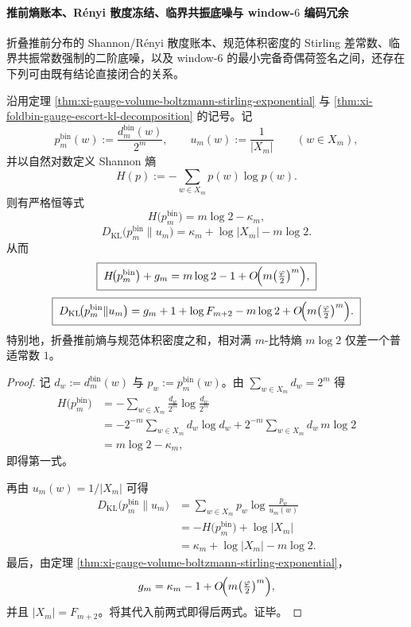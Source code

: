 \paragraph{推前熵账本、Rényi 散度冻结、临界共振底噪与 window-\texorpdfstring{$6$}{6} 编码冗余}
折叠推前分布的 Shannon/Rényi 散度账本、规范体积密度的 Stirling 差常数、临界共振常数强制的二阶底噪，以及 window-\(6\) 的最小完备奇偶荷签名之间，还存在下列可由既有结论直接闭合的关系。

\begin{theorem}\label{thm:xi-foldbin-entropy-gauge-one-nat-gap}
沿用定理 \ref{thm:xi-gauge-volume-boltzmann-stirling-exponential} 与
\ref{thm:xi-foldbin-gauge-escort-kl-decomposition} 的记号。记
\[
p_m^{\mathrm{bin}}(w):=\frac{d_m^{\mathrm{bin}}(w)}{2^m},
\qquad
u_m(w):=\frac{1}{|X_m|}
\qquad (w\in X_m),
\]
并以自然对数定义 Shannon 熵
\[
H(p):=-\sum_{w\in X_m}p(w)\log p(w).
\]
则有严格恒等式
\[
\boxed{\;
H\!\bigl(p_m^{\mathrm{bin}}\bigr)=m\log 2-\kappa_m,\;}
\]
\[
\boxed{\;
D_{\mathrm{KL}}\!\bigl(p_m^{\mathrm{bin}}\|u_m\bigr)
=
\kappa_m+\log|X_m|-m\log 2.\;}
\]
从而
\[
\boxed{\;
H\!\bigl(p_m^{\mathrm{bin}}\bigr)+g_m
=
m\log 2-1+O\!\Bigl(m\bigl(\tfrac{\varphi}{2}\bigr)^m\Bigr),\;}
\]
\[
\boxed{\;
D_{\mathrm{KL}}\!\bigl(p_m^{\mathrm{bin}}\|u_m\bigr)
=
g_m+1+\log F_{m+2}-m\log 2
+O\!\Bigl(m\bigl(\tfrac{\varphi}{2}\bigr)^m\Bigr).\;}
\]
特别地，折叠推前熵与规范体积密度之和，相对满 \(m\)-比特熵 \(m\log 2\) 仅差一个普适常数 \(1\)。
\end{theorem}
\begin{proof}
记 \(d_w:=d_m^{\mathrm{bin}}(w)\) 与 \(p_w:=p_m^{\mathrm{bin}}(w)\)。由 \(\sum_{w\in X_m}d_w=2^m\) 得
\[
\begin{aligned}
H\!\bigl(p_m^{\mathrm{bin}}\bigr)
&=-\sum_{w\in X_m}\frac{d_w}{2^m}\log\frac{d_w}{2^m}\\
&=-2^{-m}\sum_{w\in X_m}d_w\log d_w
+2^{-m}\sum_{w\in X_m}d_w\,m\log 2\\
&=m\log 2-\kappa_m,
\end{aligned}
\]
即得第一式。

再由 \(u_m(w)=1/|X_m|\) 可得
\[
\begin{aligned}
D_{\mathrm{KL}}\!\bigl(p_m^{\mathrm{bin}}\|u_m\bigr)
&=\sum_{w\in X_m}p_w\log\frac{p_w}{u_m(w)}\\
&=-H\!\bigl(p_m^{\mathrm{bin}}\bigr)+\log|X_m|\\
&=\kappa_m+\log|X_m|-m\log 2.
\end{aligned}
\]
最后，由定理 \ref{thm:xi-gauge-volume-boltzmann-stirling-exponential}，
\[
g_m=\kappa_m-1+O\!\Bigl(m\bigl(\tfrac{\varphi}{2}\bigr)^m\Bigr),
\]
并且 \(|X_m|=F_{m+2}\)。将其代入前两式即得后两式。证毕。
\end{proof}

